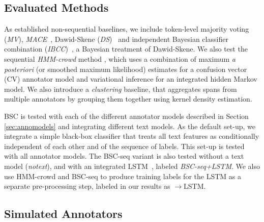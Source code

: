 
\subsection{Evaluated Methods}

As established non-sequential baselines, we include token-level majority voting (\emph{MV}), \emph{MACE}~\cite{hovy2013learning}, Dawid-Skene (\emph{DS})~\cite{dawid_maximum_1979} and independent Bayesian classifier combination (\emph{IBCC})~\cite{kim2012bayesian}, a Bayesian treatment of Dawid-Skene. 
We also test the sequential \emph{HMM-crowd} method \cite{nguyen2017aggregating}, which uses a combination of 
maximum \emph{a posteriori} (or smoothed maximum likelihood) estimates for a confusion vector (CV) annotator model 
and variational inference for an integrated hidden Markov model. 
We also introduce a \emph{clustering} baseline,
that aggregates spans from multiple annotators by grouping them together
using kernel density estimation\cite{rosenblatt1956remarks}.

BSC is tested with each of the different annotator models described in Section \ref{sec:annomodels} and integrating different text models. 
As the default set-up, 
we integrate a simple black-box classifier
that treats all text features as conditionally independent of each other and of the sequence of labels. This set-up is tested with all annotator models.
The BSC-seq variant is also tested without a text model (\emph{notext}), 
and with an integrated LSTM~\cite{lample2016neural}, labeled \emph{BSC-seq+LSTM}.
We also use HMM-crowd and BSC-seq to produce training labels for the LSTM as a separate pre-processing step, labeled in our results as $\rightarrow$LSTM.

\subsection{Simulated Annotators}\label{sec:synexpts}


